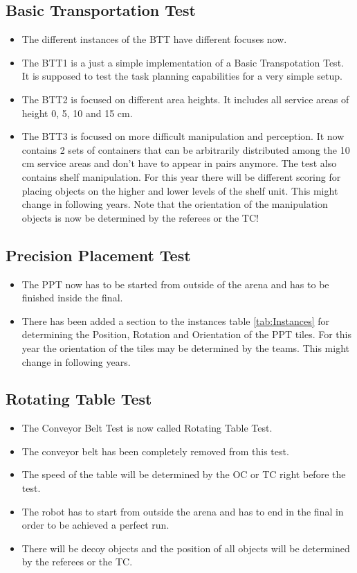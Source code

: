 \subsection{Basic Transportation Test}
\begin{itemize}
  \item The different instances of the BTT have different focuses now.
  \item The BTT1 is a just a simple implementation of a Basic Transpotation Test. It is supposed to test the task planning capabilities for a very simple setup.
  \item The BTT2 is focused on different area heights. It includes all service areas of height 0, 5, 10 and 15 cm.
  \item The BTT3 is focused on more difficult manipulation and perception. It now contains 2 sets of containers that can be arbitrarily distributed among the 10 cm service areas and don't have to appear in pairs anymore. The test also contains shelf manipulation. For this year there will be different scoring for placing objects on the higher and lower levels of the shelf unit. This might change in following years. Note that the orientation of the manipulation objects is now be determined by the referees or the TC!
\end{itemize}

\subsection{Precision Placement Test}
\begin{itemize}
  \item The PPT now has to be started from outside of the arena and has to be finished inside the final.
  \item There has been added a section to the instances table \ref{tab:Instances} for determining the Position, Rotation and Orientation of the PPT tiles. For this year the orientation of the tiles may be determined by the teams. This might change in following years.
\end{itemize}

\subsection{Rotating Table Test}
\begin{itemize}
  \item The Conveyor Belt Test is now called Rotating Table Test.
  \item The conveyor belt has been completely removed from this test.
  \item The speed of the table will be determined by the OC or TC right before the test.
  \item The robot has to start from outside the arena and has to end in the final in order to be achieved a perfect run.
  \item There will be decoy objects and the position of all objects will be determined by the referees or the TC.
\end{itemize}

